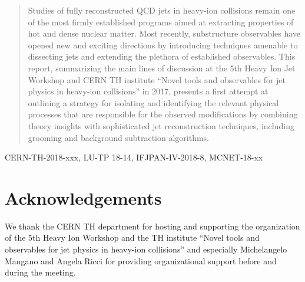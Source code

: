 \documentclass{article}
\begin{document}
\maketitle

\begin{abstract}
Studies of fully reconstructed QCD jets in heavy-ion collisions remain one of the most firmly established programs aimed at extracting properties of hot and dense nuclear matter. Most recently, substructure observables have opened new and exciting directions by introducing techniques amenable to dissecting jets and extending the plethora of established observables. This report, summarizing the main lines of discussion at the 5th Heavy Ion Jet Workshop and CERN TH institute ``Novel tools and observables for jet physics in heavy-ion collisions'' in 2017, presents a first attempt at outlining a strategy for isolating and identifying the relevant physical processes that are responsible for the observed modifications by combining theory insights with sophisticated jet reconstruction techniques, including grooming and background subtraction algorithms. 
\end{abstract}

\begin{flushright}
CERN-TH-2018-xxx, LU-TP 18-14, IFJPAN-IV-2018-8, MCNET-18-xx
\end{flushright}
%






\section*{Acknowledgements} 
We thank the CERN TH department for hosting and supporting the organization of the 5th Heavy Ion Workshop and the TH institute ``Novel tools and observables for jet physics in heavy-ion collisions'' and especially Michelangelo Mangano and Angela Ricci for providing organizational support before and during the meeting.

\appendix




\end{document}
